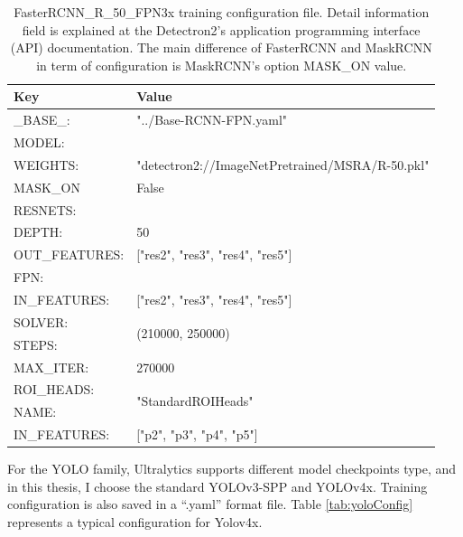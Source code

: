 \begin{table}[]
	\label{tab:fastConfig}
	\begin{tabular}{|l|l|}
		\hline
		Key            & Value                                           \\ \hline
		\_BASE\_:      & "../Base-RCNN-FPN.yaml"                         \\ \hline
		MODEL:         &                                                 \\ \hline
		WEIGHTS:       & "detectron2://ImageNetPretrained/MSRA/R-50.pkl" \\ \hline
		MASK\_ON       & False                                           \\ \hline
		RESNETS:       &                                                 \\ \hline
		DEPTH:         & 50                                              \\ \hline
		OUT\_FEATURES: & {[}"res2", "res3", "res4",   "res5"{]}          \\ \hline
		FPN:           &                                                 \\ \hline
		IN\_FEATURES:  & {[}"res2", "res3", "res4",   "res5"{]}          \\ \hline
		SOLVER:        & \multirow{2}{*}{(210000, 250000)}               \\ \cline{1-1}
		STEPS:         &                                                 \\ \hline
		MAX\_ITER:     & 270000                                          \\ \hline
		ROI\_HEADS:    & \multirow{2}{*}{"StandardROIHeads"}             \\ \cline{1-1}
		NAME:          &                                                 \\ \hline
		IN\_FEATURES:  & {[}"p2", "p3", "p4",   "p5"{]}                  \\ \hline
	\end{tabular}
	\caption{FasterRCNN\_R\_50\_FPN3x training configuration file. Detail information field is explained at the Detectron2's application programming interface (API) documentation. The main difference of FasterRCNN and MaskRCNN in term of configuration is MaskRCNN's option MASK\_ON value.}
\end{table}
For the YOLO family, Ultralytics supports different model checkpoints type, and in this thesis, I choose the standard YOLOv3-SPP and YOLOv4x. Training configuration is also saved in a “.yaml” format file. Table \ref{tab:yoloConfig} represents a typical configuration for Yolov4x.

